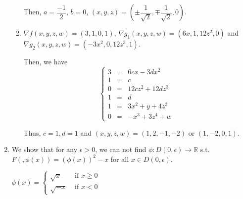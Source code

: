 \documentclass[12pt]{article}
\begin{document}
\begin{enumerate}
\begin{enumerate}
        Then, $a = \dfrac{-1}{2}$, $b = 0$, $(x, y, z) = (\pm \dfrac{1}{\sqrt{2}}, \mp \dfrac{1}{\sqrt{2}}, 0)$.
        
        \item $\nabla f(x, y, z, w) = (3, 1, 0, 1)$, $\nabla g_1(x, y, z, w) = (6x, 1, 12z^2, 0)$ and $\nabla g_2(x, y, z, w) = (-3x^2, 0, 12z^3, 1)$.
        
        Then, we have $$\left\{\begin{matrix}
            3 &=& 6cx -3dx^2\\
            1 &=& c\\
            0 &=& 12cz^2 + 12dz^3\\
            1 &=& d\\
            1 &=& 3x^2 + y + 4z^3\\
            0 &=& -x^3 + 3z^4 + w
        \end{matrix}
        \right.
        $$

        Thus, $c = 1, d = 1$ and $(x, y, z, w) = (1, 2, -1, -2)$ or $(1, -2, 0, 1)$.
    \end{enumerate}
    
    \item We show that for any $\epsilon > 0$,  we can not find $\phi : D(0, \epsilon) \to \mathbb{R}$ s.t. $F(, \phi(x)) = (\phi(x))^2 - x$ for all $x \in D(0, \epsilon)$.
    
    $\phi(x) = \left\{\begin{matrix}
        \sqrt{x} & \text{ if } x\geq 0\\
        \sqrt{-x} & \text{ if } x < 0
    \end{matrix}\right.$
\end{enumerate}
\end{document}
